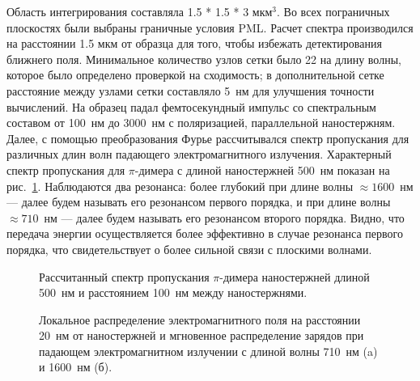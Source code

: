 Область интегрирования составляла 1.5 * 1.5 * 3 мкм$ ^3 $. Во всех пограничных плоскостях были выбраны граничные условия PML. Расчет спектра производился на расстоянии 1.5 мкм от образца для того, чтобы избежать детектирования ближнего поля. Минимальное количество узлов сетки было 22 на длину волны, которое было определено проверкой на сходимость; в дополнительной сетке расстояние между узлами сетки составляло 5~нм для улучшения точности вычислений. На образец падал фемтосекундный импульс со спектральным составом от 100~нм до 3000~нм с поляризацией, параллельной наностержням. Далее, с помощью преобразования Фурье рассчитывался спектр пропускания для различных длин волн падающего электромагнитного излучения. Характерный спектр пропускания для $ \pi $-димера с длиной наностержней 500~нм показан на рис.~\ref{img:spectraFDTDa500d100}. Наблюдаются два резонанса: более глубокий при длине волны $ \approx 1600 $~нм  --- далее будем называть его резонансом первого порядка, и при длине волны $ \approx 710 $~нм --- далее будем называть его резонансом второго порядка. Видно, что передача энергии осуществляется более эффективно в случае резонанса первого порядка, что свидетельствует о более сильной связи с плоскими волнами.
\begin{figure}
\caption{Рассчитанный спектр пропускания $ \pi $-димера наностержней длиной 500~нм и расстоянием 100~нм между наностержнями.}
\label{img:spectraFDTDa500d100}
\end{figure}
\begin{figure}
\caption{Локальное распределение электромагнитного поля на расстоянии 20~нм от наностержней и мгновенное распределение зарядов при падающем электромагнитном излучении с длиной волны 710~нм (a) и 1600~нм (б).}
\label{img:locala500d100FDTD}
\end{figure}
